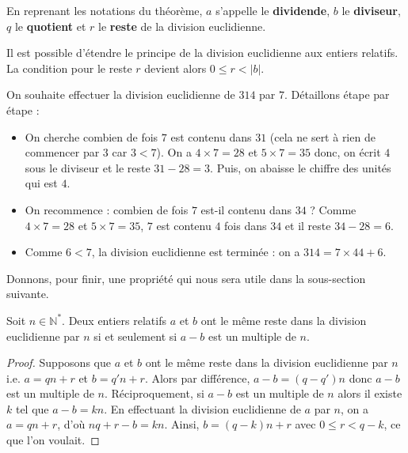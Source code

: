   \begin{definition}
    En reprenant les notations du théorème, $a$ s'appelle le \textbf{dividende}, $b$ le \textbf{diviseur}, $q$ le \textbf{quotient} et $r$ le \textbf{reste} de la division euclidienne.
  \end{definition}

  \begin{remark}
    Il est possible d'étendre le principe de la division euclidienne aux entiers relatifs. La condition pour le reste $r$ devient alors $0 \leq r < |b|$.
  \end{remark}

  \begin{example}
    On souhaite effectuer la division euclidienne de $314$ par $7$. Détaillons étape par étape :
    \begin{itemize}
      \item On cherche combien de fois $7$ est contenu dans $31$ (cela ne sert à rien de commencer par $3$ car $3 < 7$). On a $4 \times 7 = 28$ et $5 \times 7 = 35$ donc, on écrit $4$ sous le diviseur et le reste $31 - 28 = 3$. Puis, on abaisse le chiffre des unités qui est $4$.
      \item On recommence : combien de fois $7$ est-il contenu dans $34$ ? Comme $4 \times 7 = 28$ et $5 \times 7 = 35$, $7$ est contenu $4$ fois dans $34$ et il reste $34 - 28 = 6$.
      \item Comme $6 < 7$, la division euclidienne est terminée : on a $314 = 7 \times 44 + 6$.
    \end{itemize}
  \end{example}

  Donnons, pour finir, une propriété qui nous sera utile dans la sous-section suivante.

  \begin{proposition}
    Soit $n \in \mathbb{N}^*$. Deux entiers relatifs $a$ et $b$ ont le même reste dans la division euclidienne par $n$ si et seulement si $a-b$ est un multiple de $n$.
  \end{proposition}

  \begin{proof}
    Supposons que $a$ et $b$ ont le même reste dans la division euclidienne par $n$ i.e. $a = qn + r$ et $b = q'n + r$. Alors par différence, $a - b = (q-q')n$ donc $a-b$ est un multiple de $n$.
    \newpar
    Réciproquement, si $a-b$ est un multiple de $n$ alors il existe $k$ tel que $a-b = kn$. En effectuant la division euclidienne de $a$ par $n$, on a $a = qn + r$, d'où $nq + r -b = kn$. Ainsi, $b = (q-k)n + r$ avec $0 \leq r < q-k$, ce que l'on voulait.
  \end{proof}

